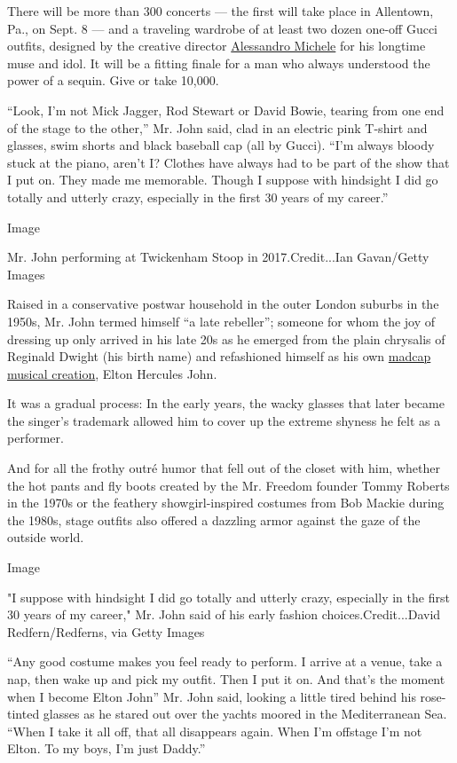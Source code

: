 There will be more than 300 concerts --- the first will take place in
Allentown, Pa., on Sept. 8 --- and a traveling wardrobe of at least two
dozen one-off Gucci outfits, designed by the creative director
\href{https://www.nytimes.com/2018/05/31/style/gucci-cruise-2019.html}{Alessandro
Michele} for his longtime muse and idol. It will be a fitting finale for
a man who always understood the power of a sequin. Give or take 10,000.

``Look, I'm not Mick Jagger, Rod Stewart or David Bowie, tearing from
one end of the stage to the other,'' Mr. John said, clad in an electric
pink T-shirt and glasses, swim shorts and black baseball cap (all by
Gucci). ``I'm always bloody stuck at the piano, aren't I? Clothes have
always had to be part of the show that I put on. They made me memorable.
Though I suppose with hindsight I did go totally and utterly crazy,
especially in the first 30 years of my career.''

Image

Mr. John performing at Twickenham Stoop in 2017.Credit...Ian Gavan/Getty
Images

Raised in a conservative postwar household in the outer London suburbs
in the 1950s, Mr. John termed himself ``a late rebeller''; someone for
whom the joy of dressing up only arrived in his late 20s as he emerged
from the plain chrysalis of Reginald Dwight (his birth name) and
refashioned himself as his own
\href{https://www.nytimes.com/2014/11/30/fashion/elton-john-and-darren-walker-on-race-sexual-identity-and-leaving-the-past-behind.html}{madcap
musical creation}, Elton Hercules John.

It was a gradual process: In the early years, the wacky glasses that
later became the singer's trademark allowed him to cover up the extreme
shyness he felt as a performer.

And for all the frothy outré humor that fell out of the closet with him,
whether the hot pants and fly boots created by the Mr. Freedom founder
Tommy Roberts in the 1970s or the feathery showgirl-inspired costumes
from Bob Mackie during the 1980s, stage outfits also offered a dazzling
armor against the gaze of the outside world.

Image

"I suppose with hindsight I did go totally and utterly crazy, especially
in the first 30 years of my career," Mr. John said of his early fashion
choices.Credit...David Redfern/Redferns, via Getty Images

``Any good costume makes you feel ready to perform. I arrive at a venue,
take a nap, then wake up and pick my outfit. Then I put it on. And
that's the moment when I become Elton John'' Mr. John said, looking a
little tired behind his rose-tinted glasses as he stared out over the
yachts moored in the Mediterranean Sea. ``When I take it all off, that
all disappears again. When I'm offstage I'm not Elton. To my boys, I'm
just Daddy.''

